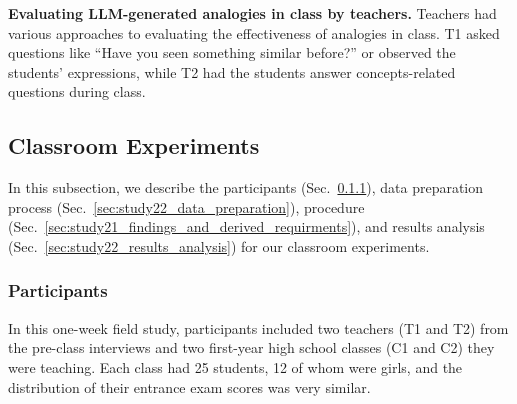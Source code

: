 \textbf{Evaluating LLM-generated analogies in class by teachers.}
Teachers had various approaches to evaluating the effectiveness of analogies in class. 
T1 asked questions like ``Have you seen something similar before?'' or observed the students' expressions, while T2 had the students answer concepts-related questions during class. 




\enlargethispage{5pt}

\subsection{Classroom Experiments}
In this subsection, we describe the participants (Sec.~\ref{sec:study22_participants}), data preparation process (Sec.~\ref{sec:study22_data_preparation}), procedure (Sec.~\ref{sec:study21_findings_and_derived_requirments}), and results analysis (Sec.~\ref{sec:study22_results_analysis}) for our classroom experiments. 
\label{sec:study22}
\subsubsection{Participants}
\label{sec:study22_participants}
In this one-week field study, participants included two teachers (T1 and T2) from the pre-class interviews and two first-year high school classes (C1 and C2) they were teaching. 
Each class had 25 students, 12 of whom were girls, and the distribution of their entrance exam scores was very similar.

